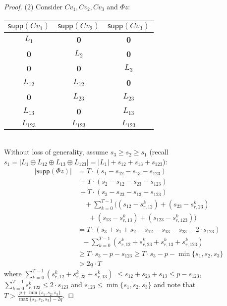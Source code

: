 \documentclass[journal]{IEEEtran}
\begin{document}
\begin{proof}
(2) Consider $Cv_1, Cv_2, Cv_3$ and $\Phi z$:\\

\begin{tabular}[!b]{ccc} 
  \hline
  $\textsf{supp}(Cv_1)$ &   $\textsf{supp}(Cv_2)$ &   $\textsf{supp}(Cv_3)$\\
  \hline
	$ L_1$ & {\bf 0 } & {\bf 0} \\
  {\bf 0}  &  $L_2$ & {\bf 0} \\
  {\bf 0} & {\bf 0} &  $L_3$ \\
 $ L_{12}$ &  $ L_{12}$ & {\bf 0 } \\
  {\bf 0} &  $ L_{23}$ &    $ L_{23}$ \\
 $ L_{13}$ & {\bf 0} &   $ L_{13}$  \\
$L_{123}$ &   $L_{123}$ &  $L_{123}$\\
  \hline
\end{tabular}\bigskip\\
\noindent Without loss of generality, assume $s_3\ge s_2 \ge s_1$ (recall $s_1 = \vert L_1 \oplus L_{12} \oplus L_{13} \oplus L_{123} \vert = \lvert L_1 \rvert + s_{12} + s_{13} + s_{123}$):
\begin{equation}
\begin{aligned}
	\lvert \textsf{supp}(\Phi z) \rvert  &=  T \cdot(s_1 - s_{12} - s_{13} - s_{123}) \\&~ + T \cdot(s_2 - s_{12} - s_{23} - s_{123}) \\&~ + T \cdot(s_3 - s_{23} - s_{13} - s_{123}) \\ 
	& \quad+ \sum_{k=0}^ {T-1} \bigg (  (s_{12} - s_{r,12}^k ) + (s_{23} - s_{r,23}^k) \\ &~~~~~~~+ (s_{13} - s_{r,13}^k) + ( s_{123} - s_{r,123}^k) \bigg) \\
	&= T \cdot (s_3 + s_1 + s_2 - s_{12} - s_{13} - s_{23} - 2 \cdot s_{123}) \\&~~~ - \sum_{k=0}^{T-1} ( s_{r,12}^k + s_{r,23}^k + s_{r,13}^k  + s_{r,123}^k ) \\
	& \ge T \cdot s_3 - p - s_{123} \ge T \cdot s_3 - p - \min \{ s_1, s_2, s_3 \} \\
	& > 2q \cdot T
		\nonumber 
\end{aligned}
\end{equation}
where
$\sum_{k=0}^{T-1} (s_{r,12}^k + s_{r,23}^k + s_{r,13}^k   )$ $\le s_{12} + s_{23} + s_{13} $$ \le p - s_{123}$, $\sum_{k=0}^{T-1} s_{r,123}^k \le 2 \cdot s_{123}$ and $ s_{123} \le \min \{ s_1, s_2, s_3 \}$ and note that $T > \frac { p + \min \{ s_1, s_2, s_3 \}} { \max \{s_1, s_2, s_3 \} - 2q }$.
\end{proof}
\end{document}

